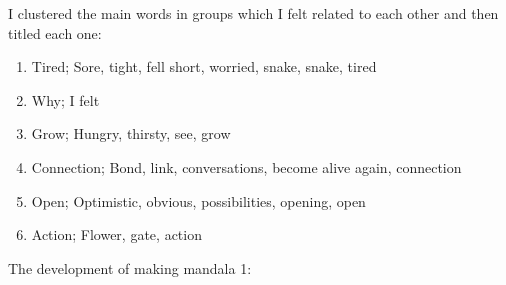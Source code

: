  
I clustered the main words in groups which I felt related to each other and then titled each one:
\begin{enumerate}
\item Tired; Sore, tight, fell short, worried, snake, snake, tired
\item Why; I felt
\item Grow; Hungry, thirsty, see, grow
\item Connection; Bond, link, conversations, become alive again, connection
\item Open; Optimistic, obvious, possibilities, opening, open
\item Action; Flower, gate, action 
\end{enumerate}

The development of making mandala 1:












